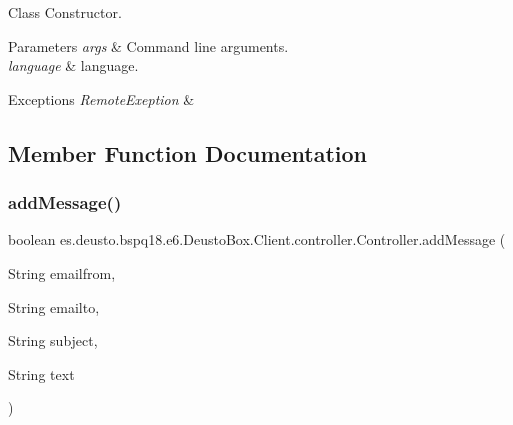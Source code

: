 Class Constructor. 
\begin{DoxyParams}{Parameters}
{\em args} & Command line arguments. \\
\hline
{\em language} & language. \\
\hline
\end{DoxyParams}

\begin{DoxyExceptions}{Exceptions}
{\em Remote\+Exeption} & \\
\hline
\end{DoxyExceptions}


\subsection{Member Function Documentation}
\mbox{\label{classes_1_1deusto_1_1bspq18_1_1e6_1_1_deusto_box_1_1_client_1_1controller_1_1_controller_a94aca031c4d92a581036dff8f7784c89}} 
\subsubsection{\texorpdfstring{add\+Message()}{addMessage()}}
{\footnotesize\ttfamily boolean es.\+deusto.\+bspq18.\+e6.\+Deusto\+Box.\+Client.\+controller.\+Controller.\+add\+Message (\begin{DoxyParamCaption}\item[{String}]{emailfrom,  }\item[{String}]{emailto,  }\item[{String}]{subject,  }\item[{String}]{text }\end{DoxyParamCaption})}

